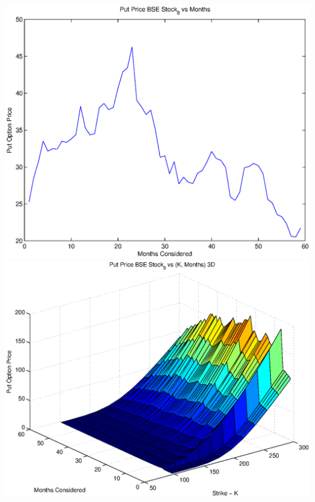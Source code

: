 \documentclass{article}
\begin{document}
\includegraphics[width=\textwidth]{Put_Price_BSE_Stock_8_vs_Months} \\

\includegraphics[width=\textwidth]{Put_Price_BSE_Stock_9_vs_(K,_Months)_3D} \\
\end{document}
